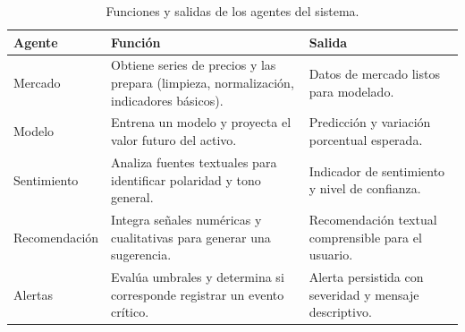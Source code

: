 \begin{table}[H]
    \centering

    \caption{Funciones y salidas de los agentes del sistema.}
    \label{tab:agentes-simple}

    \renewcommand{\arraystretch}{1.2}

    \begin{tabularx}{\textwidth}{lX X}
        \toprule
        Agente & Función & Salida \\
        \midrule

        Mercado &
        Obtiene series de precios y las prepara (limpieza, normalización, indicadores básicos). &
        Datos de mercado listos para modelado. \\

        Modelo &
        Entrena un modelo y proyecta el valor futuro del activo. &
        Predicción y variación porcentual esperada. \\

        Sentimiento &
        Analiza fuentes textuales para identificar polaridad y tono general. &
        Indicador de sentimiento y nivel de confianza. \\

        Recomendación &
        Integra señales numéricas y cualitativas para generar una sugerencia. &
        Recomendación textual comprensible para el usuario. \\

        Alertas &
        Evalúa umbrales y determina si corresponde registrar un evento crítico. &
        Alerta persistida con severidad y mensaje descriptivo. \\
        
        \bottomrule
    \end{tabularx}
\end{table}

